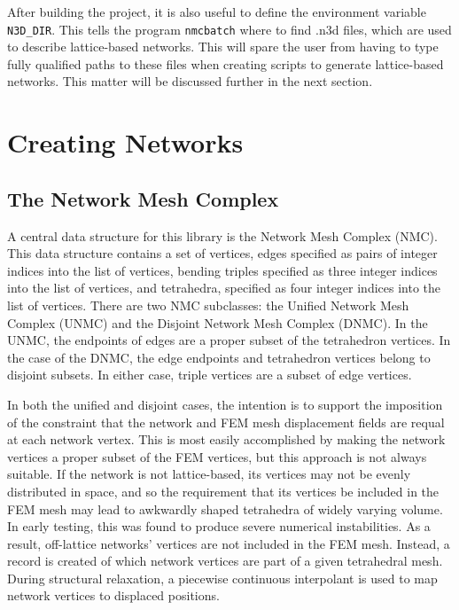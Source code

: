 \documentclass{article}
\begin{document}
After building the project, it is also useful to define the environment variable
\texttt{N3D\_DIR}. This tells the program \texttt{nmcbatch} where to find .n3d
files, which are used to describe lattice-based networks. This will spare the 
user from having to type fully qualified paths to these files when creating
scripts to generate lattice-based networks. This matter will be discussed
further in the next section.

\section{Creating Networks}

\subsection{The Network Mesh Complex}

A central data structure for this library is the Network Mesh Complex (NMC).
This data structure contains a set of vertices, edges specified as pairs
of integer indices into the list of vertices, bending triples specified as
three integer indices into the list of vertices, and tetrahedra, specified
as four integer indices into the list of vertices. There are two NMC subclasses:
the Unified Network Mesh Complex (UNMC) and the Disjoint Network Mesh Complex
(DNMC). In the UNMC, the endpoints of edges are a proper subset of the
tetrahedron vertices. In the case of the DNMC, the edge endpoints and
tetrahedron vertices belong to disjoint subsets. In either case, triple vertices
are a subset of edge vertices.

In both the unified and disjoint cases, the intention is to support the
imposition of the constraint that the network and FEM mesh displacement
fields are requal at each network vertex. This is most easily accomplished by
making the network vertices a proper subset of the FEM vertices, but this
approach is not always suitable. If the network is not lattice-based, its
vertices may not be evenly distributed in space, and so the requirement that
its vertices be included in the FEM mesh may lead to awkwardly shaped tetrahedra
of widely varying volume. In early testing, this was found to produce severe
numerical instabilities. As a result, off-lattice networks' vertices are not
included in the FEM mesh. Instead, a record is created of which network vertices
are part of a given tetrahedral mesh. During structural relaxation, a piecewise
continuous interpolant is used to map network vertices to displaced positions.
\end{document}
